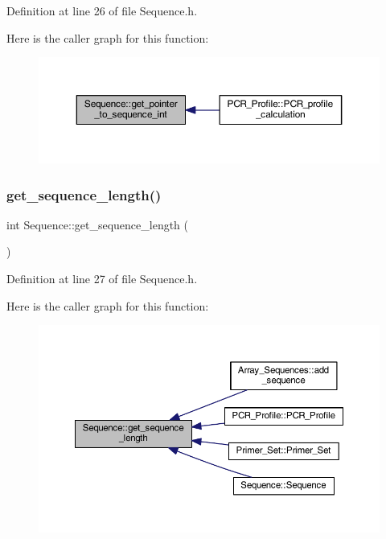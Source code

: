 Definition at line 26 of file Sequence.\+h.

Here is the caller graph for this function\+:
\nopagebreak
\begin{figure}[H]
\begin{center}
\leavevmode
\includegraphics[width=350pt]{class_sequence_af37c4ac41b89a5081ca71ff2a9d9bd1c_icgraph}
\end{center}
\end{figure}
\mbox{\label{class_sequence_a5454c394570fa19c2b0ac771c6e74097}} 
\subsubsection{\texorpdfstring{get\+\_\+sequence\+\_\+length()}{get\_sequence\_length()}}
{\footnotesize\ttfamily int Sequence\+::get\+\_\+sequence\+\_\+length (\begin{DoxyParamCaption}{ }\end{DoxyParamCaption})\hspace{0.3cm}{\ttfamily [inline]}}



Definition at line 27 of file Sequence.\+h.

Here is the caller graph for this function\+:
\nopagebreak
\begin{figure}[H]
\begin{center}
\leavevmode
\includegraphics[width=350pt]{class_sequence_a5454c394570fa19c2b0ac771c6e74097_icgraph}
\end{center}
\end{figure}
\mbox{\label{class_sequence_a01816c20cdd1c716a30b03c24a5a2b7f}} 
